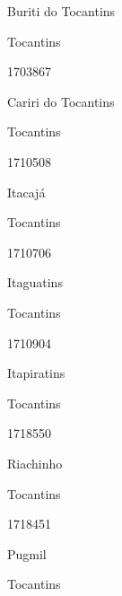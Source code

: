 \documentclass[
  letterpaper,
]{report}
\begin{document}
Buriti do Tocantins

\n    

\n    

\n      

Tocantins

\n      

1703867

\n      

Cariri do Tocantins

\n    

\n    

\n      

Tocantins

\n      

1710508

\n      

Itacajá

\n    

\n    

\n      

Tocantins

\n      

1710706

\n      

Itaguatins

\n    

\n    

\n      

Tocantins

\n      

1710904

\n      

Itapiratins

\n    

\n    

\n      

Tocantins

\n      

1718550

\n      

Riachinho

\n    

\n    

\n      

Tocantins

\n      

1718451

\n      

Pugmil

\n    

\n    

\n      

Tocantins
\end{document}
